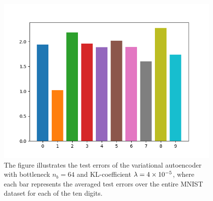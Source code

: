 \begin{figure}
\begin{center}
      \includegraphics[width=0.55\linewidth]{convolutional_VAE_snd_KL_4e-5_10k_epochs_64D_errors}
\end{center}
\caption{The figure illustrates the test errors of the variational autoencoder with bottleneck $n_b=64$ and KL-coefficient $\lambda = \num{4e-5}$, where each bar represents the averaged test errors over the entire MNIST dataset for each of the ten digits.}\label{fig:convolutional_VAE_snd_KL_4e-5_10k_epochs_64D_errors}
\end{figure}


